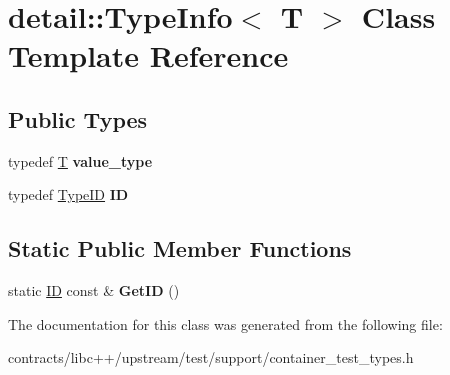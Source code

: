 \hypertarget{classdetail_1_1_type_info}{}\section{detail\+:\+:Type\+Info$<$ T $>$ Class Template Reference}
\label{classdetail_1_1_type_info}
\subsection*{Public Types}
\begin{DoxyCompactItemize}
\item 
\mbox{\label{classdetail_1_1_type_info_a204e78f9f14df69e6a1169c5019bae0b}} 
typedef \mbox{\hyperlink{struct_t}{T}} {\bfseries value\+\_\+type}
\item 
\mbox{\label{classdetail_1_1_type_info_a1a7c497091a567ab48eb3c55d6d17c96}} 
typedef \mbox{\hyperlink{structdetail_1_1_type_i_d}{Type\+ID}} {\bfseries ID}
\end{DoxyCompactItemize}
\subsection*{Static Public Member Functions}
\begin{DoxyCompactItemize}
\item 
\mbox{\label{classdetail_1_1_type_info_a4860ee462f7b389abbce9fba7cba0ac8}} 
static \mbox{\hyperlink{structdetail_1_1_type_i_d}{ID}} const  \& {\bfseries Get\+ID} ()
\end{DoxyCompactItemize}


The documentation for this class was generated from the following file\+:\begin{DoxyCompactItemize}
\item 
contracts/libc++/upstream/test/support/container\+\_\+test\+\_\+types.\+h\end{DoxyCompactItemize}
